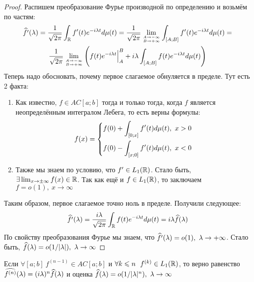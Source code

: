 \begin{proof}
	Распишем преобразование Фурье производной по определению и возьмём по частям:
	\begin{multline*}
		\widehat{f'}(\lambda) = \frac{1}{\sqrt{2\pi}} \int_{\mathbb{R}} f'(t)e^{-i\lambda t}d\mu(t) = \frac{1}{\sqrt{2\pi}} \lim_{A \to -\infty \atop {B \to +\infty}} \int_{[A; B]} f'(t)e^{-i\lambda t}d\mu(t) =
		\\
		\frac{1}{\sqrt{2\pi}} \lim_{A \to -\infty \atop {B \to +\infty}} \left(f(t)e^{-i\lambda t}\Big|_A^B + i\lambda \int_{[A; B]} f(t)e^{-i\lambda t}d\mu(t)\right)
	\end{multline*}
	Теперь надо обосновать, почему первое слагаемое обнуляется в пределе. Тут есть 2 факта:
	\begin{enumerate}
		\item Как известно, $f \in AC[a; b]$ тогда и только тогда, когда $f$ является неопределённым интегралом Лебега, то есть верны формулы:
		\[
			f(x) = \left\{ \begin{aligned} 
				&{f(0) + \int_{[0; x]} f'(t)d\mu(t),\ x > 0}
				\\
				&{f(0) - \int_{[x; 0]} f'(t)d\mu(t),\ x < 0}
			 \end{aligned} \right.
		\]
		
		\item Также мы знаем по условию, что $f' \in L_1(\mathbb{R})$. Стало быть, $\exists \lim_{x \to \pm \infty} f(x) \in \mathbb{R}$. Так как ещё и $f \in L_1(\mathbb{R})$, то заключаем $f = o(1),\ x \to \infty$
	\end{enumerate}
	Таким образом, первое слагаемое точно ноль в пределе. Получили следующее:
	\[
		\widehat{f'}(\lambda) = \frac{i\lambda}{\sqrt{2\pi}} \int_{\mathbb{R}} f(t)e^{-i\lambda t}d\mu(t) = i\lambda\widehat{f}(\lambda)
	\]
	По свойству преобразования Фурье мы знаем, что $\widehat{f'}(\lambda) = o(1),\ \lambda \to +\infty$. Стало быть, $\widehat{f}(\lambda) = o(1 / |\lambda|),\ \lambda \to \infty$
\end{proof}

\begin{corollary}
	Если $\forall [a; b]\ f^{(n - 1)} \in AC[a; b]$ и $\forall k \leqslant n\ \ f^{(k)} \in L_1(\mathbb{R})$, то верно равенство $\widehat{f^{(n)}}(\lambda) = (i\lambda)^n\widehat{f}(\lambda)$ и оценка $\widehat{f}(\lambda) = o(1 / |\lambda|^n),\ \lambda \to \infty$
\end{corollary}